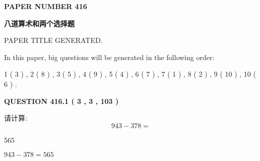 \documentclass{ctexart}
\begin{document}
 
 
 
 
   
   
\newpage 
\setcounter{page}{ 
   416001 } 
   
   
   
   
 {\textbf{ \Large{ PAPER NUMBER  416  }}}
   
   
\vspace{0.2in}
   
   
   
   
   
   
   
   
 \vspace{0.2in}
{\LARGE {\textbf{ 八道算术和两个选择题}}}
   
   
 PAPER TITLE GENERATED.
   
   
   
\vspace{0.2in}
   
In this paper, big questions will be generated in the following order: 
   
   
   1 ( 3 )
 ,
   2 ( 8 )
 ,
   3 ( 5 )
 ,
   4 ( 9 )
 ,
   5 ( 4 )
 ,
   6 ( 7 )
 ,
   7 ( 1 )
 ,
   8 ( 2 )
 ,
   9 ( 10 )
 ,
   10 ( 6 )
 .
  
\vspace{0.2in}
  
{\textbf{\Large{QUESTION
416.1 
 ( 3 , 3 , 103 )
}}}
  
  
 
请计算:
\begin{equation}
943 -   %
378 = \nonumber
\end{equation}
 
 
 
\noindent{}
 
 

565
 
 
\noindent{}
 
 

 
 
 
\noindent{}
 
 

$ %
943 -  %
378=   %
565$
 
 
\noindent{}
 
\end{document}
